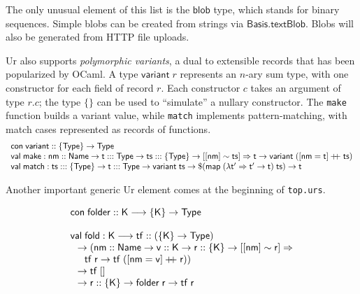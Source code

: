 \documentclass{article}
\newcommand{\cd}[1]{\texttt{#1}}
\newcommand{\mt}[1]{\mathsf{#1}}
\newcommand{\rc}{+ \hspace{-.075in} + \;}
\begin{document}
The only unusual element of this list is the $\mt{blob}$ type, which stands for binary sequences.  Simple blobs can be created from strings via $\mt{Basis.textBlob}$.  Blobs will also be generated from HTTP file uploads.

Ur also supports \emph{polymorphic variants}, a dual to extensible records that has been popularized by OCaml.  A type $\mt{variant} \; r$ represents an $n$-ary sum type, with one constructor for each field of record $r$.  Each constructor $c$ takes an argument of type $r.c$; the type $\{\}$ can be used to ``simulate'' a nullary constructor.  The \cd{make} function builds a variant value, while \cd{match} implements pattern-matching, with match cases represented as records of functions.
$$\begin{array}{l}
  \mt{con} \; \mt{variant} :: \{\mt{Type}\} \to \mt{Type} \\
  \mt{val} \; \mt{make} : \mt{nm} :: \mt{Name} \to \mt{t} ::: \mt{Type} \to \mt{ts} ::: \{\mt{Type}\} \to [[\mt{nm}] \sim \mt{ts}] \Rightarrow \mt{t} \to \mt{variant} \; ([\mt{nm} = \mt{t}] \rc \mt{ts}) \\
  \mt{val} \; \mt{match} : \mt{ts} ::: \{\mt{Type}\} \to \mt{t} ::: \mt{Type} \to \mt{variant} \; \mt{ts} \to \$(\mt{map} \; (\lambda \mt{t'} \Rightarrow \mt{t'} \to \mt{t}) \; \mt{ts}) \to \mt{t}
\end{array}$$

Another important generic Ur element comes at the beginning of \texttt{top.urs}.

$$\begin{array}{l}
  \mt{con} \; \mt{folder} :: \mt{K} \longrightarrow \{\mt{K}\} \to \mt{Type} \\
  \\
  \mt{val} \; \mt{fold} : \mt{K} \longrightarrow \mt{tf} :: (\{\mt{K}\} \to \mt{Type}) \\
  \hspace{.1in} \to (\mt{nm} :: \mt{Name} \to \mt{v} :: \mt{K} \to \mt{r} :: \{\mt{K}\} \to [[\mt{nm}] \sim \mt{r}] \Rightarrow \\
  \hspace{.2in} \mt{tf} \; \mt{r} \to \mt{tf} \; ([\mt{nm} = \mt{v}] \rc \mt{r})) \\
  \hspace{.1in} \to \mt{tf} \; [] \\
  \hspace{.1in} \to \mt{r} :: \{\mt{K}\} \to \mt{folder} \; \mt{r} \to \mt{tf} \; \mt{r}
\end{array}$$
\end{document}

